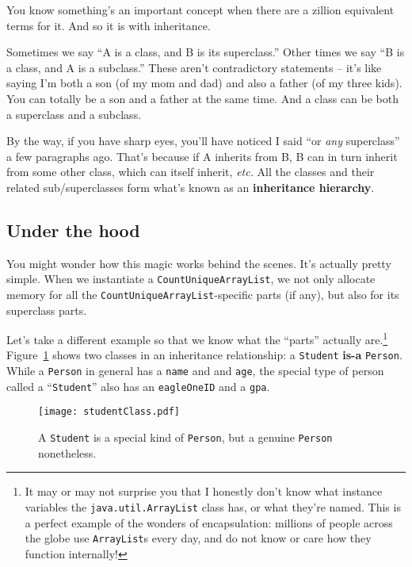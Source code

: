 You know something's an important concept when there are a zillion equivalent
terms for it. And so it is with inheritance.

Sometimes we say ``A is a class, and B is its superclass.'' Other times we say
``B is a class, and A is a subclass.'' These aren't contradictory statements --
it's like saying I'm both a son (of my mom and dad) and also a father (of my
three kids). You can totally be a son and a father at the same time. And a
class can be both a superclass and a subclass.

By the way, if you have sharp eyes, you'll have noticed I said ``or
\textit{any} superclass'' a few paragraphs ago. That's because if A inherits
from B, B can in turn inherit from some other class, which can itself inherit,
\textit{etc.} All the classes and their related sub/superclasses form what's
known as an \textbf{inheritance hierarchy}.

\subsection{Under the hood}

You might wonder how this magic works behind the scenes. It's actually pretty
simple. When we instantiate a \texttt{CountUniqueArrayList}, we not only
allocate memory for all the \texttt{CountUniqueArrayList}-specific parts (if
any), but also for its superclass parts.

Let's take a different example so that we know what the ``parts'' actually
are.\footnote{It may or may not surprise you that I honestly don't know what
instance variables the \texttt{java.util.ArrayList} class has, or what they're
named. This is a perfect example of the wonders of encapsulation: millions of
people across the globe use \texttt{ArrayList}s every day, and do not know or
care how they function internally!} Figure~\ref{fig:studentClass} shows two
classes in an inheritance relationship: a \texttt{Student} \textbf{is-a}
\texttt{Person}. While a \texttt{Person} in general has a \texttt{name} and 
and \texttt{age}, the special type of person called a ``\texttt{Student}'' also
has an \texttt{eagleOneID} and a \texttt{gpa}.

\begin{figure}
\centering
\texttt{[image: studentClass.pdf]}
\caption{A \texttt{Student} is a special kind of \texttt{Person}, but a
genuine \texttt{Person} nonetheless.}
\label{fig:studentClass}
\end{figure}

